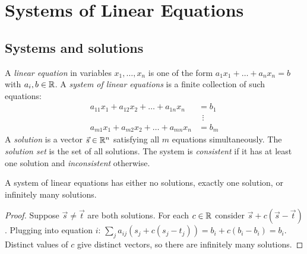 \chapter{Systems of Linear Equations}

\section{Systems and solutions}

\begin{definition}
A \emph{linear equation} in variables $x_1,\dots,x_n$ is one of the form
$a_1x_1+\dots+a_nx_n=b$ with $a_i,b\in\mathbb{R}$. A \emph{system of linear equations} is a finite
collection of such equations:
\[
\begin{aligned}
  a_{11}x_1 + a_{12}x_2 + \dots + a_{1n}x_n &= b_1\\
  &\ \ \vdots\\
  a_{m1}x_1 + a_{m2}x_2 + \dots + a_{mn}x_n &= b_m
\end{aligned}
\]
A \emph{solution} is a vector $\vec s\in\mathbb{R}^n$ satisfying all $m$ equations simultaneously. The
\emph{solution set} is the set of all solutions. The system is \emph{consistent} if it has at
least one solution and \emph{inconsistent} otherwise.
\end{definition}

\begin{theorem}
A system of linear equations has either no solutions, exactly one solution, or infinitely many
solutions.
\end{theorem}
\begin{proof}
Suppose $\vec s\ne\vec t$ are both solutions. For each $c\in\mathbb{R}$ consider $\vec s+c(\vec s-\vec t)$.
Plugging into equation $i$:
$\sum_j a_{ij}(s_j + c(s_j-t_j)) = b_i + c(b_i-b_i) = b_i$. Distinct values of $c$ give distinct
vectors, so there are infinitely many solutions.
\end{proof}

